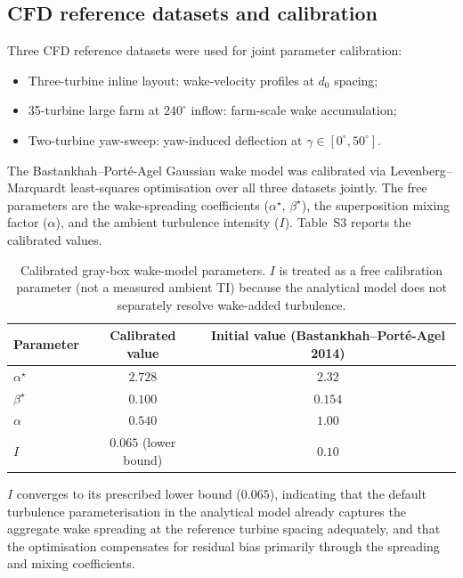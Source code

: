 \documentclass{article}
\begin{document}
\subsection{CFD reference datasets and calibration}

Three CFD reference datasets were used for joint parameter calibration:
\begin{itemize}
\item Three-turbine inline layout: wake-velocity profiles at $d_0$ spacing;
\item 35-turbine large farm at $240^\circ$ inflow: farm-scale wake accumulation;
\item Two-turbine yaw-sweep: yaw-induced deflection at $\gamma{\in}[0^\circ,50^\circ]$.
\end{itemize}

The Bastankhah--Port\'e-Agel Gaussian wake model was calibrated via Levenberg--Marquardt least-squares optimisation over all three datasets jointly. The free parameters are the wake-spreading coefficients ($\alpha^\star$, $\beta^\star$), the superposition mixing factor ($\alpha$), and the ambient turbulence intensity ($I$). Table~S3 reports the calibrated values.

\begin{table}[h]
\centering
\caption{Calibrated gray-box wake-model parameters. $I$ is treated as a free calibration parameter (not a measured ambient TI) because the analytical model does not separately resolve wake-added turbulence.}
\label{tab:calib_params}
\small
\begin{tabular}{lcc}
\toprule
Parameter & Calibrated value & Initial value (Bastankhah--Port\'e-Agel 2014) \\
\midrule
$\alpha^\star$ & $2.728$ & $2.32$ \\
$\beta^\star$  & $0.100$ & $0.154$ \\
$\alpha$       & $0.540$ & $1.00$ \\
$I$            & $0.065$ (lower bound) & $0.10$ \\
\bottomrule
\end{tabular}
\end{table}

$I$ converges to its prescribed lower bound ($0.065$), indicating that the default turbulence parameterisation in the analytical model already captures the aggregate wake spreading at the reference turbine spacing adequately, and that the optimisation compensates for residual bias primarily through the spreading and mixing coefficients.
\end{document}
